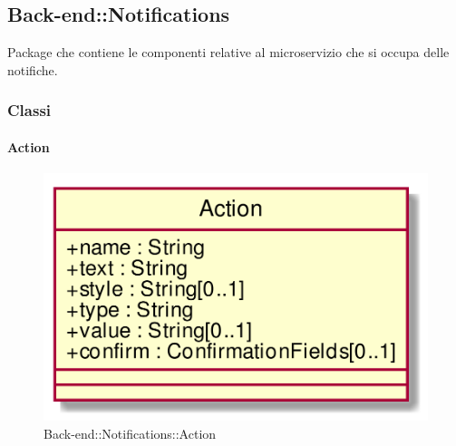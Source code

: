 \FloatBarrier

\subsection{Back-end::Notifications}
Package che contiene le componenti relative al microservizio che si occupa delle notifiche.
\subsubsection{Classi}
\hypertarget{Action_label}{\paragraph{Action}}
\begin{figure}[h]
	\centering
	\includegraphics[width=\textwidth,height=\textheight,keepaspectratio]{images/ClassAction.png}
	\caption{Back-end::Notifications::Action}
\end{figure}
